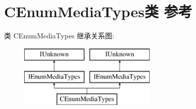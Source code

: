 \hypertarget{class_c_enum_media_types}{}\section{C\+Enum\+Media\+Types类 参考}
\label{class_c_enum_media_types}
类 C\+Enum\+Media\+Types 继承关系图\+:\begin{figure}[H]
\begin{center}
\leavevmode
\includegraphics[height=3.000000cm]{class_c_enum_media_types}
\end{center}
\end{figure}
